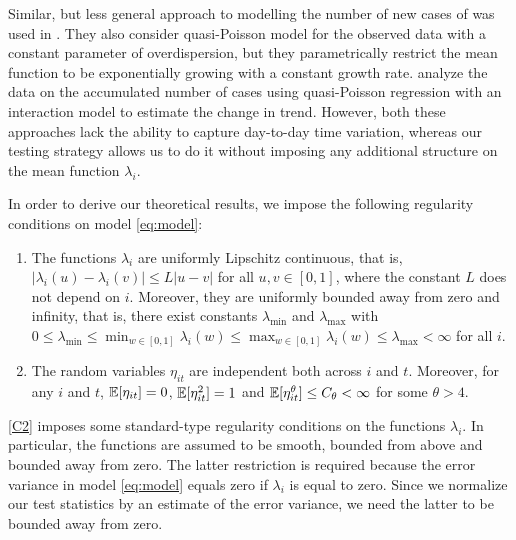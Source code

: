 \documentclass[a4paper,12pt]{article}
\numberwithin{equation}{section}
\begin{document}
Similar, but less general approach to modelling the number of new cases of  was used in \cite{Pellis2020}. They also consider quasi-Poisson model for the observed data with a constant parameter of overdispersion, but they parametrically restrict the mean function to be exponentially growing with a constant growth rate. \cite{Tobias2020} analyze the data on the accumulated number of cases using quasi-Poisson regression with an interaction model to estimate the change in trend. However, both these approaches lack the ability to capture day-to-day time variation, whereas our testing strategy allows us to do it without imposing any additional structure on the mean function $\lambda_i$.
 
In order to derive our theoretical results, we impose the following regularity conditions on model \eqref{eq:model}:
\begin{enumerate}[label=(C\arabic*),leftmargin=1.0cm]
\item \label{C2} The functions $\lambda_i$ are uniformly Lipschitz continuous, that is, $|\lambda_i(u) - \lambda_i(v)| \le L |u-v|$ for all $u, v \in [0,1]$, where the constant $L$ does not depend on $i$. Moreover, they are uniformly bounded away from zero and infinity, that is, there exist constants $\lambda_{\min}$ and $\lambda_{\max}$ with $0 \le \lambda_{\min} \le \min_{w \in [0,1]} \lambda_i(w) \le \max_{w \in [0,1]} \lambda_i(w) \le \lambda_{\max} < \infty$ for all $i$. 
\item \label{C1} The random variables $\eta_{it}$ are independent both across $i$ and $t$. Moreover, for any $i$ and $t$, $\mathbb{E}[\eta_{it}] = 0$, $\mathbb{E}[\eta_{it}^2] = 1$ and $\mathbb{E}[\eta_{it}^\theta] \le C_\theta < \infty$ for some $\theta > 4$. 
\end{enumerate}
\ref{C2} imposes some standard-type regularity conditions on the functions $\lambda_i$. In particular, the functions are assumed to be smooth, bounded from above and bounded away from zero. The latter restriction is required because the error variance in model \eqref{eq:model} equals zero if $\lambda_i$ is equal to zero. Since we normalize our test statistics by an estimate of the error variance, we need the latter to be bounded away from zero. 
\end{document}
